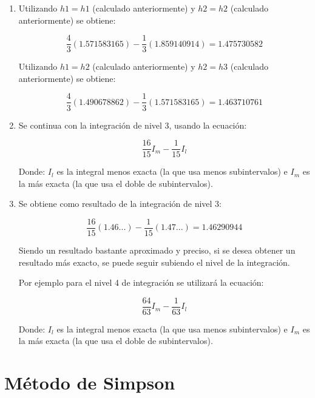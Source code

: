 \documentclass[journal,transmag]{IEEEtran}
\theoremstyle{mytheoremstyle}
\theoremstyle{mytheoremstyle}
\theoremstyle{myproblemstyle}
\begin{document}
\begin{enumerate}
    \item   Utilizando $h1 = h1$ (calculado anteriormente) y $h2 = h2$ (calculado anteriormente) se obtiene:
    \begin{center}
    \begin{equation}
        \frac{4}{3}(1.571583165)-\frac{1}{3}(1.859140914) = 1.475730582
    \end{equation}
    \end{center}
    Utilizando $h1 = h2$ (calculado anteriormente) y $h2 = h3$ (calculado anteriormente) se obtiene:
    \begin{center}
    \begin{equation}
        \frac{4}{3}(1.490678862)-\frac{1}{3}(1.571583165) = 1.463710761
    \end{equation}
    \end{center}
    \item   Se continua con la integración de nivel 3, usando la ecuación:
    \begin{center}
    \begin{equation}
        \frac{16}{15}I_m-\frac{1}{15}I_l
    \end{equation}
    \end{center}
    Donde: $I_l$ es la integral menos exacta (la que usa menos subintervalos) e $I_m$ es la más exacta (la que usa el doble de subintervalos).
    \item   Se obtiene como resultado de la integración de nivel 3:
    \begin{center}
    \begin{equation}
        \frac{16}{15}(1.46...)-\frac{1}{15}(1.47...) = 1.46290944
    \end{equation}
    \end{center}
    Siendo un resultado bastante aproximado y preciso, si se desea obtener un resultado más exacto, se puede seguir subiendo el nivel de la integración.

    Por ejemplo para el nivel 4 de integración se utilizará la ecuación:
    \begin{center}
    \begin{equation}
        \frac{64}{63}I_m-\frac{1}{63}I_l
    \end{equation}
    \end{center}
    Donde: $I_l$ es la integral menos exacta (la que usa menos subintervalos) e $I_m$ es la más exacta (la que usa el doble de subintervalos).
    \end{enumerate}
\section{Método de Simpson}
\end{document}

